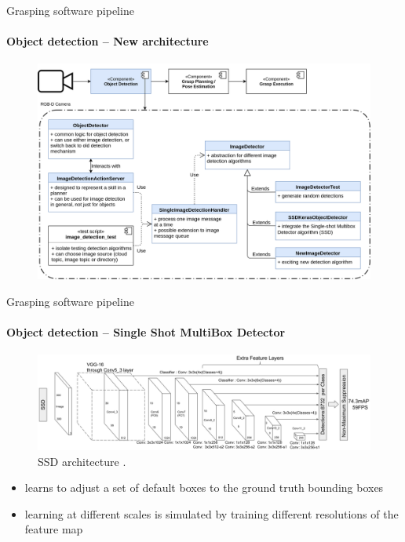 \documentclass{beamer}
\begin{document}
\begin{frame}{Grasping software pipeline}
\framesubtitle{Object detection -- New architecture}
    \begin{figure}[b]
        \centering
        \includegraphics[width=0.95\linewidth]{grasp_pipeline_new_perception}
    \end{figure}
\end{frame}

\begin{frame}{Grasping software pipeline}
    \framesubtitle{Object detection -- Single Shot MultiBox Detector}
    \begin{figure}[b]
        \centering
        \includegraphics[width=0.8\linewidth]{liu_et_al-2016-ssd_arch}
        \caption{SSD architecture \cite{Liu2016SSD}.}
        \label{fig:ssd_arch}
    \end{figure}
    \begin{itemize}
        \item learns to adjust a set of default boxes to the ground truth bounding boxes
        \item learning at different scales is simulated by training different resolutions of the feature map
    \end{itemize}
\end{frame}
\end{document}
